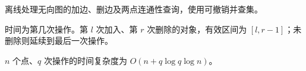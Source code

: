 离线处理无向图的加边、删边及两点连通性查询，使用可撤销并查集。

时间为第几次操作。第 $l$ 次加入、第 $r$ 次删除的对象，有效区间为 $[l,r-1]$；未删除则延续到最后一次操作。

$n$ 个点、$q$ 次操作的时间复杂度为 $O(n+q\log q\log n)$。
